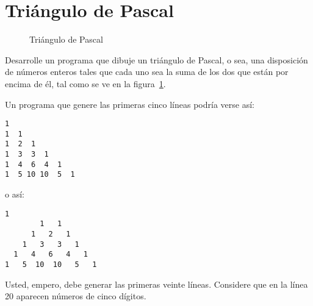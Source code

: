 \section{Triángulo de Pascal}

\begin{figure}
  \centering
  
  \caption{Triángulo de Pascal}
  \label{fig:triangulo-pascal}
\end{figure}

Desarrolle un programa que dibuje un
triángulo de Pascal, o sea, una disposición de números enteros tales que cada uno
sea la suma de los dos que están por encima de él,
tal como se ve en la figura~\ref{fig:triangulo-pascal}.

Un programa que genere las primeras cinco líneas
podría verse así:
\begin{lstlisting}[language=testcase]
1
1  1
1  2  1
1  3  3  1
1  4  6  4  1
1  5 10 10  5  1
\end{lstlisting}
o así:
\begin{lstlisting}[language=testcase]
          1
        1   1
      1   2   1
    1   3   3   1
  1   4   6   4   1
1   5  10  10   5   1
\end{lstlisting}
Usted, empero, debe generar las primeras veinte líneas.
Considere que en la línea 20 aparecen números de cinco dígitos.

